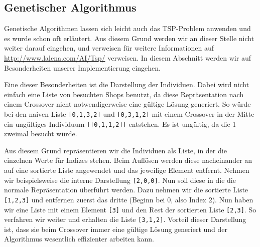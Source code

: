 \subsection{Genetischer Algorithmus}

Genetische Algorithmen lassen sich leicht auch das TSP-Problem anwenden und es wurde schon oft erläutert. Aus diesem Grund werden wir an dieser Stelle nicht weiter darauf eingehen, und verweisen für weitere Informationen auf \url{http://www.lalena.com/AI/Tsp/} verweisen. In diesem Abschnitt werden wir auf Besonderheiten unserer Implementierung eingehen. 

Eine dieser Besonderheiten ist die Darstellung der Individuen. Dabei wird nicht einfach eine Liste von besuchten Shops benutzt, da diese Repräsentation nach einem Crossover nicht notwendigerweise eine gültige Lösung generiert. So würde bei den naiven Liste \texttt{[0,1,3,2]} und \texttt{[0,3,1,2]} mit einem Crossover in der Mitte ein ungültiges Individuum \texttt{[[0,1,1,2]]} entstehen. Es ist ungültig, da die 1 zweimal besucht würde. 

Aus diesem Grund repräsentieren wir die Individuen als Liste, in der die einzelnen Werte für Indizes stehen. Beim Auflösen werden diese nacheinander an auf eine sortierte Liste angewendet und das jeweilige Element entfernt. Nehmen wir beispielsweise die interne Darstellung \texttt{[2,0,0]}. Nun soll diese in die die normale Repräsentation überführt werden. Dazu nehmen wir die sortierte Liste \texttt{[1,2,3]} und entfernen zuerst das dritte (Beginn bei 0, also Index 2). Nun haben wir eine Liste mit einem Element \texttt{[3]} und den Rest der sortierten Liste \texttt{[2,3]}. So verfahren wir weiter und erhalten die Liste \texttt{[3,1,2]}. Vorteil dieser Darstellung ist, dass sie beim Crossover immer eine gültige Lösung generiert und der Algorithmus wesentlich effizienter arbeiten kann.


